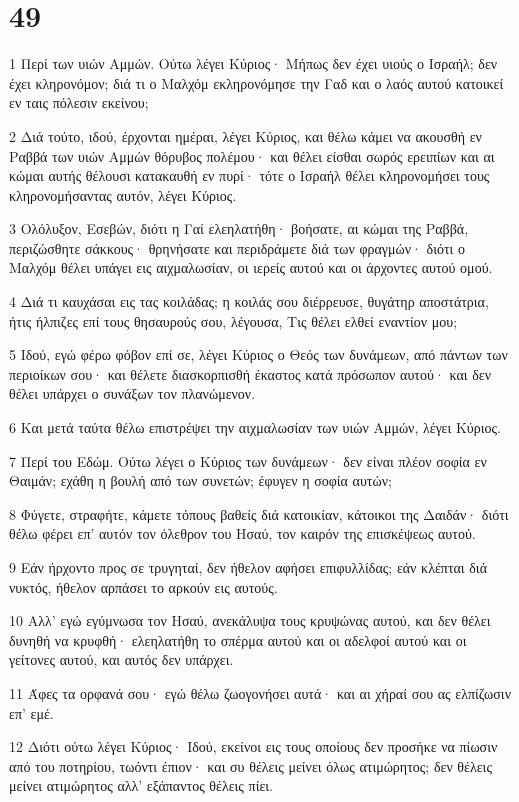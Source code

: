 \chapter{49}

\par 1 Περί των υιών Αμμών. Ούτω λέγει Κύριος· Μήπως δεν έχει υιούς ο Ισραήλ; δεν έχει κληρονόμον; διά τι ο Μαλχόμ εκληρονόμησε την Γαδ και ο λαός αυτού κατοικεί εν ταις πόλεσιν εκείνου;
\par 2 Διά τούτο, ιδού, έρχονται ημέραι, λέγει Κύριος, και θέλω κάμει να ακουσθή εν Ραββά των υιών Αμμών θόρυβος πολέμου· και θέλει είσθαι σωρός ερειπίων και αι κώμαι αυτής θέλουσι κατακαυθή εν πυρί· τότε ο Ισραήλ θέλει κληρονομήσει τους κληρονομήσαντας αυτόν, λέγει Κύριος.
\par 3 Ολόλυξον, Εσεβών, διότι η Γαί ελεηλατήθη· βοήσατε, αι κώμαι της Ραββά, περιζώσθητε σάκκους· θρηνήσατε και περιδράμετε διά των φραγμών· διότι ο Μαλχόμ θέλει υπάγει εις αιχμαλωσίαν, οι ιερείς αυτού και οι άρχοντες αυτού ομού.
\par 4 Διά τι καυχάσαι εις τας κοιλάδας; η κοιλάς σου διέρρευσε, θυγάτηρ αποστάτρια, ήτις ήλπιζες επί τους θησαυρούς σου, λέγουσα, Τις θέλει ελθεί εναντίον μου;
\par 5 Ιδού, εγώ φέρω φόβον επί σε, λέγει Κύριος ο Θεός των δυνάμεων, από πάντων των περιοίκων σου· και θέλετε διασκορπισθή έκαστος κατά πρόσωπον αυτού· και δεν θέλει υπάρχει ο συνάξων τον πλανώμενον.
\par 6 Και μετά ταύτα θέλω επιστρέψει την αιχμαλωσίαν των υιών Αμμών, λέγει Κύριος.
\par 7 Περί του Εδώμ. Ούτω λέγει ο Κύριος των δυνάμεων· δεν είναι πλέον σοφία εν Θαιμάν; εχάθη η βουλή από των συνετών; έφυγεν η σοφία αυτών;
\par 8 Φύγετε, στραφήτε, κάμετε τόπους βαθείς διά κατοικίαν, κάτοικοι της Δαιδάν· διότι θέλω φέρει επ' αυτόν τον όλεθρον του Ησαύ, τον καιρόν της επισκέψεως αυτού.
\par 9 Εάν ήρχοντο προς σε τρυγηταί, δεν ήθελον αφήσει επιφυλλίδας; εάν κλέπται διά νυκτός, ήθελον αρπάσει το αρκούν εις αυτούς.
\par 10 Αλλ' εγώ εγύμνωσα τον Ησαύ, ανεκάλυψα τους κρυψώνας αυτού, και δεν θέλει δυνηθή να κρυφθή· ελεηλατήθη το σπέρμα αυτού και οι αδελφοί αυτού και οι γείτονες αυτού, και αυτός δεν υπάρχει.
\par 11 Άφες τα ορφανά σου· εγώ θέλω ζωογονήσει αυτά· και αι χήραί σου ας ελπίζωσιν επ' εμέ.
\par 12 Διότι ούτω λέγει Κύριος· Ιδού, εκείνοι εις τους οποίους δεν προσήκε να πίωσιν από του ποτηρίου, τωόντι έπιον· και συ θέλεις μείνει όλως ατιμώρητος; δεν θέλεις μείνει ατιμώρητος αλλ' εξάπαντος θέλεις πίει.
